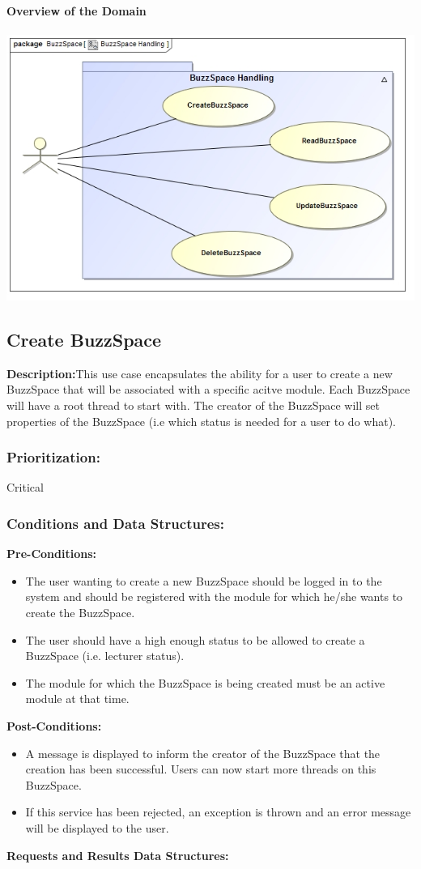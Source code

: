 \documentclass[a4paper,11pt]{article}
\begin{document}
\textbf{Overview of the Domain}\\\\
\includegraphics[width=1\linewidth]{./Images/BuzzSpaceHandling/Overview.jpg}\\
\subsection{Create BuzzSpace}
\textbf{Description:}This use case encapsulates the ability for a user to create a new BuzzSpace that will be associated with a specific acitve module. 
Each BuzzSpace will have a root thread to start with. The creator of the BuzzSpace will set properties of the BuzzSpace (i.e which status is needed for a user 
to do what). 
\subsubsection{Prioritization:}Critical
\subsubsection{Conditions and Data Structures:}
\textbf{Pre-Conditions:}
\begin{itemize}
	\item The user wanting to create a new BuzzSpace should be logged in to the system and should be registered with the module for which he/she wants to
	create the BuzzSpace. 
	\item The user should have a high enough status to be allowed to create a BuzzSpace (i.e. lecturer status).
	\item The module for which the BuzzSpace is being created must be an active module at that time.
\end{itemize}
\textbf{Post-Conditions:}
\begin{itemize}
	\item A message is displayed to inform the creator of the BuzzSpace that the creation has been successful. Users can now start more threads on this BuzzSpace.
	\item If this service has been rejected, an exception is thrown and an error message will be displayed to the user.
\end{itemize}
\textbf{Requests and Results Data Structures:}
\end{document}
